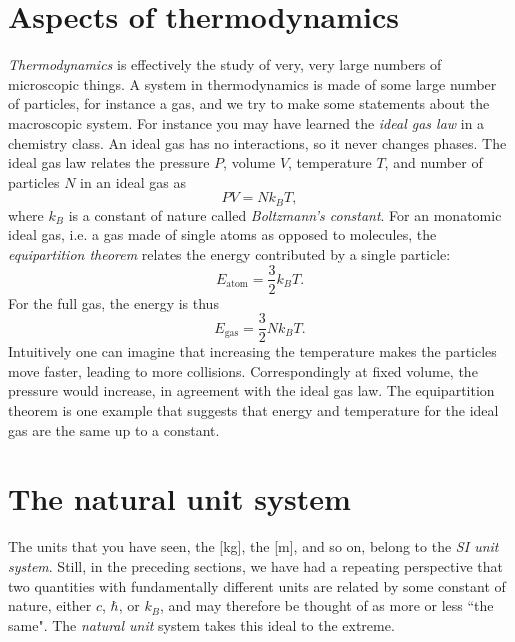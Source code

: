 \section{Aspects of thermodynamics}\label{sec:thermo}

{\it Thermodynamics} is effectively the study of very, very large numbers of
microscopic things. A system in thermodynamics is made of some large number of
particles, for instance a gas, and we try to make some statements about the
macroscopic system. For instance you may have learned the {\it ideal gas law} in
a chemistry class. An ideal gas has no interactions, so it
never changes phases. The ideal gas law relates the pressure $P$, volume $V$,
temperature $T$, and number of particles $N$ in an ideal gas as
\begin{equation}
PV=Nk_BT,
\end{equation}
where $k_B$ is a constant of nature called {\it Boltzmann's
constant}. For an monatomic ideal gas, i.e. a gas made
of single atoms as opposed to molecules, the {\it equipartition theorem} relates
the energy contributed by a single particle:
\begin{equation}\label{eq:equipartition}
E_{\text{atom}}=\frac{3}{2}k_BT.
\end{equation}
For the full gas, the energy is thus
\begin{equation}
E_{\text{gas}}=\frac{3}{2}Nk_BT.
\end{equation}
Intuitively one can imagine that increasing the temperature makes the particles
move faster, leading to more collisions. Correspondingly at fixed volume, the
pressure would increase, in agreement with the ideal gas law.
The equipartition theorem is one example that suggests that energy and
temperature for the ideal gas are the same up to a constant.


\section{The natural unit system}\label{sec:units}

The units that you have seen, the [kg], the [m], and so on, belong to the {\it
SI unit system}. Still, in the preceding sections, 
we have had a repeating perspective that two
quantities with fundamentally different units are related by some constant of
nature, either $c$, $\hbar$, or $k_B$, and may therefore be thought of as 
more or less ``the same".
The {\it natural unit} system takes this ideal to the extreme.

